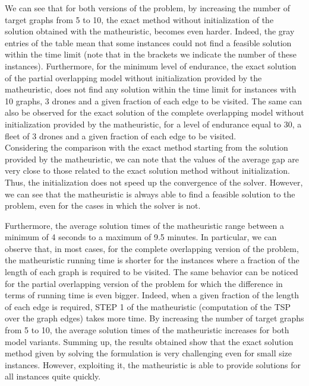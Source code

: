 \documentclass[10pt,a4paper]{elsarticle}
\newcommand{\EN}[1]{{\color{black}#1}}
\begin{document}
We can see that for both versions of the problem, by increasing the number of target graphs from 5 to 10, the exact method without initialization of the solution obtained with the matheuristic, becomes even harder. Indeed, the gray entries of the table mean that some instances could not find a feasible solution within the time limit (note that in the brackets we indicate the number of these instances). 
\EN{Furthermore}, for the minimum level of endurance, the exact solution of the partial overlapping model without initialization provided by the matheuristic, does not find any solution within the time limit for instances with 10 graphs, 3 drones and a given fraction of each edge to be visited. The same can \EN{also} be observed for the exact solution of the complete overlapping model without initialization provided by the matheuristic, for a level of endurance equal to 30, a fleet of 3 drones and a given fraction of each edge to be visited.\\
Considering the comparison with the exact method starting from the solution provided by the matheuristic, we can note that the values of the average gap are very close to \EN{those} related to the exact solution method without initialization. Thus, the initialization does not speed up the convergence of the solver. However, we can see that the matheuristic is always able to find a feasible solution \EN{to} the problem, even for the cases in which the solver is not. 


\noindent
Furthermore, the average solution times of the matheuristic range between a minimum of 4 seconds to a maximum of 9.5 minutes. In particular, we can observe that, in most cases, for the complete overlapping version of the problem, the matheuristic running time is shorter for the instances where a fraction of the length of each graph is required to be visited. The same \EN{behavior} can be noticed for the partial overlapping version of the problem for which the difference in terms of running time is even bigger. Indeed, when a given fraction of the length of each edge is required, STEP 1 of the matheuristic (computation of the TSP over the graph edges) takes more time. By increasing the number of target graphs from 5 to 10, the average solution times of the matheuristic increases for both model variants.
Summing up, the results obtained show that the exact solution method given by solving the formulation is very challenging even for small size instances. However, exploiting it, the matheuristic is able to provide  solutions for all instances \EN{quite} quickly.
\end{document}

